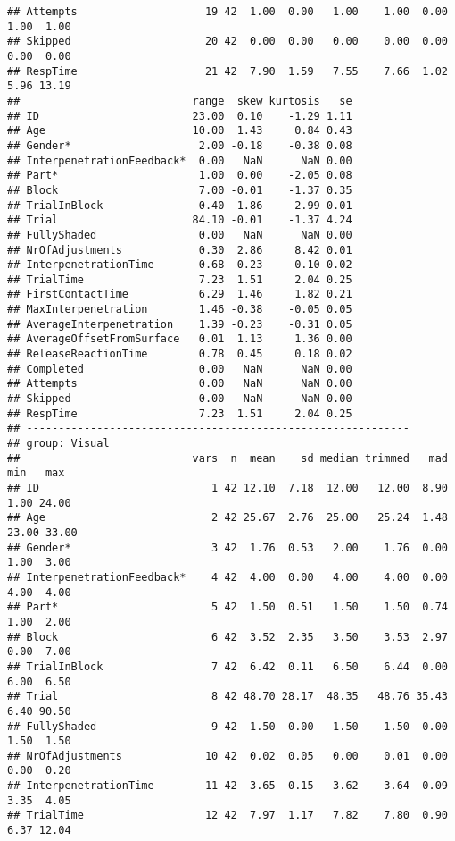 \documentclass[
]{article}
\begin{document}
\begin{verbatim}
## Attempts                    19 42  1.00  0.00   1.00    1.00  0.00  1.00  1.00
## Skipped                     20 42  0.00  0.00   0.00    0.00  0.00  0.00  0.00
## RespTime                    21 42  7.90  1.59   7.55    7.66  1.02  5.96 13.19
##                           range  skew kurtosis   se
## ID                        23.00  0.10    -1.29 1.11
## Age                       10.00  1.43     0.84 0.43
## Gender*                    2.00 -0.18    -0.38 0.08
## InterpenetrationFeedback*  0.00   NaN      NaN 0.00
## Part*                      1.00  0.00    -2.05 0.08
## Block                      7.00 -0.01    -1.37 0.35
## TrialInBlock               0.40 -1.86     2.99 0.01
## Trial                     84.10 -0.01    -1.37 4.24
## FullyShaded                0.00   NaN      NaN 0.00
## NrOfAdjustments            0.30  2.86     8.42 0.01
## InterpenetrationTime       0.68  0.23    -0.10 0.02
## TrialTime                  7.23  1.51     2.04 0.25
## FirstContactTime           6.29  1.46     1.82 0.21
## MaxInterpenetration        1.46 -0.38    -0.05 0.05
## AverageInterpenetration    1.39 -0.23    -0.31 0.05
## AverageOffsetFromSurface   0.01  1.13     1.36 0.00
## ReleaseReactionTime        0.78  0.45     0.18 0.02
## Completed                  0.00   NaN      NaN 0.00
## Attempts                   0.00   NaN      NaN 0.00
## Skipped                    0.00   NaN      NaN 0.00
## RespTime                   7.23  1.51     2.04 0.25
## ------------------------------------------------------------ 
## group: Visual
##                           vars  n  mean    sd median trimmed   mad   min   max
## ID                           1 42 12.10  7.18  12.00   12.00  8.90  1.00 24.00
## Age                          2 42 25.67  2.76  25.00   25.24  1.48 23.00 33.00
## Gender*                      3 42  1.76  0.53   2.00    1.76  0.00  1.00  3.00
## InterpenetrationFeedback*    4 42  4.00  0.00   4.00    4.00  0.00  4.00  4.00
## Part*                        5 42  1.50  0.51   1.50    1.50  0.74  1.00  2.00
## Block                        6 42  3.52  2.35   3.50    3.53  2.97  0.00  7.00
## TrialInBlock                 7 42  6.42  0.11   6.50    6.44  0.00  6.00  6.50
## Trial                        8 42 48.70 28.17  48.35   48.76 35.43  6.40 90.50
## FullyShaded                  9 42  1.50  0.00   1.50    1.50  0.00  1.50  1.50
## NrOfAdjustments             10 42  0.02  0.05   0.00    0.01  0.00  0.00  0.20
## InterpenetrationTime        11 42  3.65  0.15   3.62    3.64  0.09  3.35  4.05
## TrialTime                   12 42  7.97  1.17   7.82    7.80  0.90  6.37 12.04

\end{verbatim}
\end{document}
